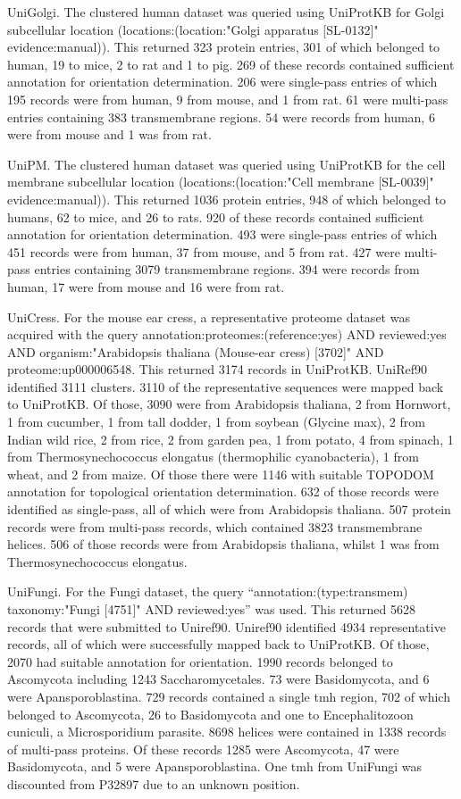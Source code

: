 UniGolgi. The clustered human dataset was queried using UniProtKB for Golgi subcellular location (locations:(location:"Golgi apparatus [SL-0132]" evidence:manual)). This returned 323 protein entries, 301 of which belonged to human, 19 to mice, 2 to rat and 1 to pig. 269 of these records contained sufficient annotation for orientation determination. 206 were single-pass entries of which 195 records were from human, 9 from mouse, and 1 from rat. 61 were multi-pass entries containing 383 transmembrane regions. 54 were records from human, 6 were from mouse and 1 was from rat.

UniPM. The clustered human dataset was queried using UniProtKB for the cell membrane subcellular location (locations:(location:"Cell membrane [SL-0039]" evidence:manual)). This returned 1036 protein entries, 948 of which belonged to humans, 62 to mice, and 26 to rats. 920 of these records contained sufficient annotation for orientation determination. 493 were single-pass entries of which 451 records were from human, 37 from mouse, and 5 from rat. 427 were multi-pass entries containing 3079 transmembrane regions. 394 were records from human, 17 were from mouse and 16 were from rat.

UniCress. For the mouse ear cress, a representative proteome dataset was acquired with the query annotation:proteomes:(reference:yes) AND reviewed:yes AND organism:"Arabidopsis thaliana (Mouse-ear cress) [3702]" AND proteome:up000006548. This returned 3174 records in UniProtKB. UniRef90 identified 3111 clusters. 3110 of the representative sequences were mapped back to UniProtKB. Of those, 3090 were from Arabidopsis thaliana, 2 from Hornwort, 1 from cucumber, 1 from tall dodder, 1 from soybean (Glycine max), 2 from Indian wild rice, 2 from rice, 2 from garden pea, 1 from potato, 4 from spinach, 1 from Thermosynechococcus elongatus (thermophilic cyanobacteria), 1 from wheat, and 2 from maize. Of those there were 1146 with suitable TOPO\textunderscore DOM annotation for topological orientation determination. 632 of those records were identified as single-pass, all of which were from Arabidopsis thaliana. 507 protein records were from multi-pass records, which contained 3823 transmembrane helices. 506 of those records were from Arabidopsis thaliana, whilst 1 was from Thermosynechococcus elongatus.

UniFungi. For the Fungi dataset, the query “annotation:(type:transmem) taxonomy:"Fungi [4751]" AND reviewed:yes” was used. This returned 5628 records that were submitted to Uniref90. Uniref90 identified 4934 representative records, all of which were successfully mapped back to UniProtKB. Of those, 2070 had suitable annotation for orientation. 1990 records belonged to Ascomycota including 1243 Saccharomycetales. 73 were Basidomycota, and 6 were Apansporoblastina. 729 records contained a single \gls{tmh} region, 702 of which belonged to Ascomycota, 26 to Basidomycota and one to Encephalitozoon cuniculi, a Microsporidium parasite. 8698 helices were contained in 1338 records of multi-pass proteins. Of these records 1285 were Ascomycota, 47 were Basidomycota, and 5 were Apansporoblastina. One \gls{tmh} from UniFungi was discounted from P32897 due to an unknown position.

